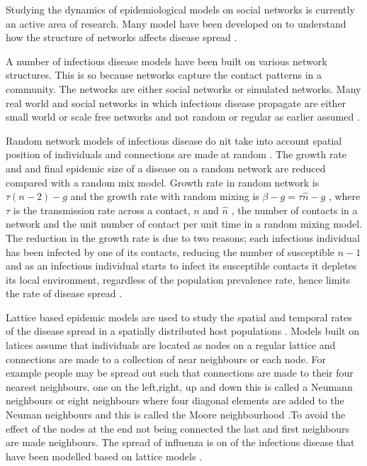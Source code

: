 Studying the dynamics of epidemiological models on social networks is currently an active area of research. Many model have been developed on to understand  how the structure of networks affects disease spread \citep{keeling2005networks}.

A number of infectious disease models have been built on various network structures. This is so because networks capture the contact patterns in a community. The networks are either social networks or simulated networks. Many real world and social networks in which infectious disease propagate are either small world or scale free networks and not random or regular as earlier assumed \cite{watts1998collective}.

Random network models of infectious disease do nit take into account spatial position of individuals and connections are made at random \citep{keeling2005networks}. The growth rate and and final epidemic size of a disease on a random network are reduced compared with a random mix model. Growth rate in random network is $\tau (n -2) -g$ and the growth rate with random mixing is $\beta -g = \tau \widehat{n} -g$ , where  $\tau$ is the transmission rate across a contact, $n$ and $\widehat{n} $ , the number of contacts in a network and the unit number of contact per unit time in a random mixing model. The reduction in the growth rate is due to two reasons; each infectious individual has been infected by one of its contacts, reducing the number of susceptible $n-1$ and as an infectious individual starts to infect its susceptible contacts it depletes its local environment, regardless of the population prevalence rate, hence limits the rate of disease spread \citep{keeling2005networks}.

Lattice based epidemic models are used to study the spatial and temporal rates of the disease spread in  a spatially distributed host populations \citep{rhodes1997epidemic}. Models built on latices assume that individuals are located as nodes on a regular lattice and connections are made to a collection of near neighbours or each node. For example people may be spread out such that connections are made to their four nearest neighbours, one on the left,right, up and down this is called a Neumann neighbours  or eight neighbours where four diagonal elements are added to the Neuman neighbours and this is called the Moore neighbourhood \citep{lloyd2006infection}.To avoid the effect of the nodes at the end not being connected the last and first neighbours are made neighbours. The spread of influenza is on of the infectious disease that have been modelled based on lattice models \cite{liccardo2013lattice}. 

